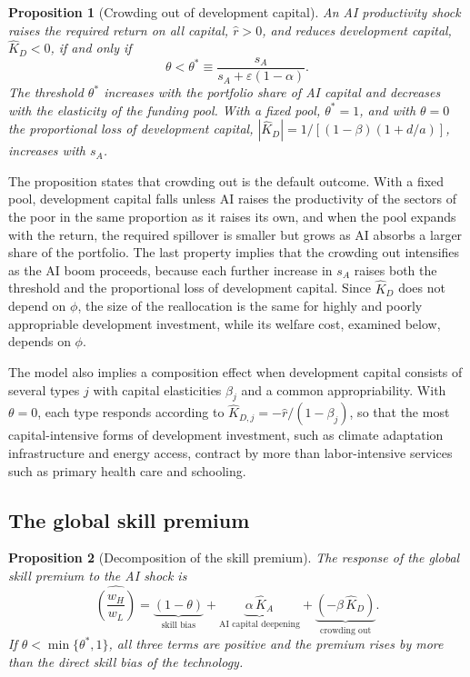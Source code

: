 \documentclass[AER]{AEA}
\newtheorem{proposition}{Proposition}
\newcommand{\sA}{s_A}
\begin{document}
\begin{proposition}[Crowding out of development capital]\label{prop:crowd}
An AI productivity shock raises the required return on all capital, $\hat{r}>0$, and reduces development capital, $\hat{K}_D<0$, if and only if
\begin{equation}\label{eq:theta}
\theta<\theta^{*}\equiv\frac{\sA}{\sA+\varepsilon(1-\alpha)} .
\end{equation}
The threshold $\theta^{*}$ increases with the portfolio share of AI capital and decreases with the elasticity of the funding pool. With a fixed pool, $\theta^{*}=1$, and with $\theta=0$ the proportional loss of development capital, $|\hat{K}_D|=1/[(1-\beta)(1+d/a)]$, increases with $\sA$.
\end{proposition}

The proposition states that crowding out is the default outcome. With a fixed pool, development capital falls unless AI raises the productivity of the sectors of the poor in the same proportion as it raises its own, and when the pool expands with the return, the required spillover is smaller but grows as AI absorbs a larger share of the portfolio. The last property implies that the crowding out intensifies as the AI boom proceeds, because each further increase in $\sA$ raises both the threshold and the proportional loss of development capital. Since $\hat{K}_D$ does not depend on $\phi$, the size of the reallocation is the same for highly and poorly appropriable development investment, while its welfare cost, examined below, depends on $\phi$.

The model also implies a composition effect when development capital consists of several types $j$ with capital elasticities $\beta_j$ and a common appropriability. With $\theta=0$, each type responds according to $\hat{K}_{D,j}=-\hat{r}/(1-\beta_j)$, so that the most capital-intensive forms of development investment, such as climate adaptation infrastructure and energy access, contract by more than labor-intensive services such as primary health care and schooling.

\subsection{The global skill premium}

\begin{proposition}[Decomposition of the skill premium]\label{prop:prem}
The response of the global skill premium to the AI shock is
\begin{equation}\label{eq:prem}
\widehat{\left(\frac{w_H}{w_L}\right)}
=\underbrace{(1-\theta)}_{\text{skill bias}}
+\underbrace{\alpha\,\hat{K}_A}_{\text{AI capital deepening}}
+\underbrace{(-\beta\,\hat{K}_D)}_{\text{crowding out}} .
\end{equation}
If $\theta<\min\{\theta^{*},1\}$, all three terms are positive and the premium rises by more than the direct skill bias of the technology.
\end{proposition}
\end{document}
